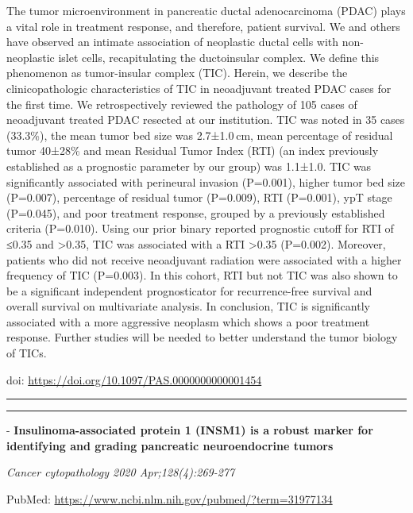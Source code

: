 \documentclass[
]{article}
\begin{document}
The tumor microenvironment in pancreatic ductal adenocarcinoma (PDAC)
plays a vital role in treatment response, and therefore, patient
survival. We and others have observed an intimate association of
neoplastic ductal cells with non-neoplastic islet cells, recapitulating
the ductoinsular complex. We define this phenomenon as tumor-insular
complex (TIC). Herein, we describe the clinicopathologic characteristics
of TIC in neoadjuvant treated PDAC cases for the first time. We
retrospectively reviewed the pathology of 105 cases of neoadjuvant
treated PDAC resected at our institution. TIC was noted in 35 cases
(33.3\%), the mean tumor bed size was 2.7±1.0 cm, mean percentage of
residual tumor 40±28\% and mean Residual Tumor Index (RTI) (an index
previously established as a prognostic parameter by our group) was
1.1±1.0. TIC was significantly associated with perineural invasion
(P=0.001), higher tumor bed size (P=0.007), percentage of residual tumor
(P=0.009), RTI (P=0.001), ypT stage (P=0.045), and poor treatment
response, grouped by a previously established criteria (P=0.010). Using
our prior binary reported prognostic cutoff for RTI of ≤0.35 and
\textgreater0.35, TIC was associated with a RTI \textgreater0.35
(P=0.002). Moreover, patients who did not receive neoadjuvant radiation
were associated with a higher frequency of TIC (P=0.003). In this
cohort, RTI but not TIC was also shown to be a significant independent
prognosticator for recurrence-free survival and overall survival on
multivariate analysis. In conclusion, TIC is significantly associated
with a more aggressive neoplasm which shows a poor treatment response.
Further studies will be needed to better understand the tumor biology of
TICs.

doi: \url{https://doi.org/10.1097/PAS.0000000000001454}

\begin{center}\rule{0.5\linewidth}{0.5pt}\end{center}

\begin{center}\rule{0.5\linewidth}{0.5pt}\end{center}

- \textbf{Insulinoma-associated protein 1 (INSM1) is a robust marker for
identifying and grading pancreatic neuroendocrine tumors}

\emph{Cancer cytopathology 2020 Apr;128(4):269-277}

PubMed: \url{https://www.ncbi.nlm.nih.gov/pubmed/?term=31977134}
\end{document}
